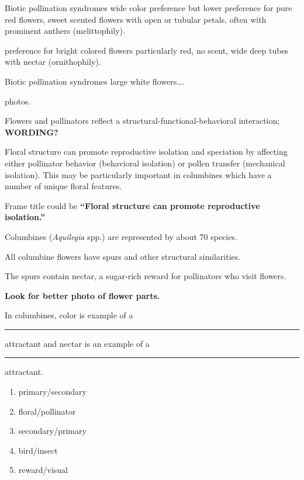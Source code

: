 \documentclass[t,hidelinks]{beamer}
\newcommand{\ques}[1]{\highlight{\textsc{q#1:}}}
\begin{document}
%
\begin{frame}[t]{Biotic pollination syndromes}
	\hangpara {} wide color preference but lower preference for pure red flowers, sweet scented flowers with open or tubular petals, often with prominent anthers (melittophily).
	
	\hangpara {} preference for bright colored flowers particularly red, no scent, wide deep tubes with nectar (ornithophily).
	
\end{frame}
%
\begin{frame}[t]{Biotic pollination syndromes}
	\hangpara {} large white flowers\dots.
	
	\hangpara {} photos.
	
\end{frame}
%
\begin{frame}[t]{Flowers and pollinators reflect a structural-functional-behavioral interaction; \textbf{WORDING?}}
	
	\hangpara Floral structure can promote reproductive isolation and speciation by affecting either pollinator behavior (behavioral isolation) or pollen transfer (mechanical isolation). This may be particularly important in columbines which have a number of unique floral features.  
	
	Frame title could be \textbf{“Floral structure can promote reproductive isolation.”}

\end{frame}
%
\begin{frame}[t]{Columbines (\textit{Aquilegia} spp.) are represented by about 70 species.}
	
	\hangpara All columbine flowers have spurs and other structural similarities.
	
	\hangpara The spurs contain nectar, a sugar-rich reward for pollinators who visit flowers.  

	\hangpara \textbf{Look for better photo of flower parts.}
\end{frame}
%
\begin{frame}[t]{\ques7 In columbines, color is example of a \rule{0.5in}{0.4pt} attractant and nectar is an example of a \rule{0.5in}{0.4pt} attractant.}
	\begin{enumerate}
		\item primary/secondary
		\item floral/pollinator
		\item secondary/primary
		\item bird/insect
		\item reward/visual
	\end{enumerate}
\end{frame}
\end{document}

